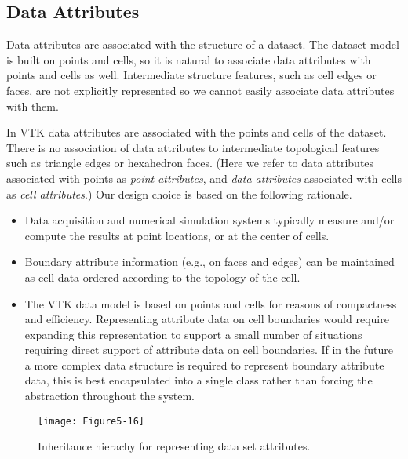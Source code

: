 \subsection{Data Attributes}

Data attributes are associated with the structure of a dataset. The dataset model is built on points and cells, so it is natural to associate data attributes with points and cells as well. Intermediate structure features, such as cell edges or faces, are not explicitly represented so we cannot easily associate data attributes with them.

In VTK data attributes are associated with the points and cells of the dataset. There is no association of data attributes to intermediate topological features such as triangle edges or hexahedron faces. (Here we refer to data attributes associated with points as \emph{point attributes}, and \emph{data attributes} associated with cells as \emph{cell attributes}.) Our design choice is based on the following rationale.

\begin{itemize}

	\item Data acquisition and numerical simulation systems typically measure and/or compute the results at point locations, or at the center of cells.

	\item Boundary attribute information (e.g., on faces and edges) can be maintained as cell data ordered according to the topology of the cell.

	\item The VTK data model is based on points and cells for reasons of compactness and efficiency. Representing attribute data on cell boundaries would require expanding this representation to support a small number of situations requiring direct support of attribute data on cell boundaries. If in the future a more complex data structure is required to represent boundary attribute data, this is best encapsulated into a single class rather than forcing the abstraction throughout the system.

\end{itemize}
\begin{figure}[!htb]
	\centering
	\texttt{[image: Figure5-16]}
	\caption{Inheritance hierachy for representing data set attributes.}
	\label{fig:Figure5-16}
\end{figure}

